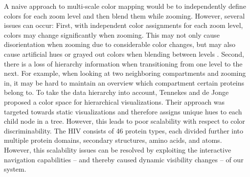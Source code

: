 \documentclass{egpubl}
\begin{document}
	A naive approach to multi-scale color mapping would be to independently define colors for each zoom level and then blend them while zooming. 
	However, several issues can occur:
	First, with independent color assignments for each zoom level, colors may change significantly when zooming.
	This may not only cause disorientation when zooming due to considerable color changes, but may also cause artificial hues or grayed out colors when blending between levels \cite{chuang2009hue}.  
	Second, there is a loss of hierarchy information when transitioning from one level to the next. 
	For example, when looking at two neighboring compartments and zooming in, it may be hard to maintain an overview which compartment certain proteins belong to. 
	To take the data hierarchy into account, Tennekes and de Jonge~\cite{tennekes2014tree} proposed a color space for hierarchical visualizations. 
	Their approach was targeted towards static visualizations and therefore assigns unique hues to each child node in a tree. 
	However, this leads to poor scalability with respect to color discriminability. 
	The HIV consists of 46 protein types, each divided further into multiple protein domains, secondary structures, amino acids, and atoms. 
	However, this scalability issues can be resolved by exploiting the interactive navigation capabilities -- and thereby caused dynamic visibility changes -- of our system. 
	
	
	
\end{document}

